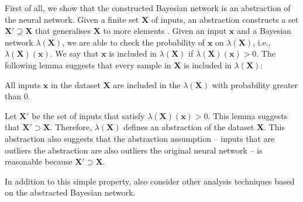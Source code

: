 First of all, we show that the constructed Bayesian network is an abstraction of the neural network.
Given a finite set $\textbf{X}$ of inputs, an abstraction constructs a set $\textbf{X}' \supseteq \textbf{X}$ that generalises $\textbf{X}$ to more elements \cite{DBLP:journals/corr/abs-1911-09032}. Given an input $\textbf{x}$ and a Bayesian network $\lambda(\textbf{X})$, we are able to check the probability of $\textbf{x}$ on $\lambda(\textbf{X})$, i.e., $\lambda(\textbf{X})(\textbf{x})$. We say that $\textbf{x}$ is included in $\lambda(\textbf{X})$ if $\lambda(\textbf{X})(\textbf{x})>0$.
The following lemma suggests that every sample in $\textbf{X}$ is included in $\lambda(\textbf{X})$:

\begin{lemma}\label{lemma:abstraction}
  All inputs $\textbf{x}$ in the dataset $\textbf{X}$ are included in the $\lambda(\textbf{X})$ with probability greater than 0.
\end{lemma}

Let $\textbf{X}'$ be the set of inputs that satisfy $\lambda(\textbf{X})(\textbf{x})>0$. This lemma suggests that $\textbf{X}'\supset \textbf{X}$. Therefore, $\lambda(\textbf{X})$ defines an abstraction of the dataset $\textbf{X}$.
This abstraction also suggests that the abstraction assumption -- \ie inputs that are outliers \wrt the abstraction are also outliers \wrt the original neural network -- is reasonable because $\textbf{X}'\supset \textbf{X}$.

In addition to this simple property, \cite{berthier2021abstraction,Alshareef2022} also consider other analysis techniques based on the abstracted Bayesian network. 

